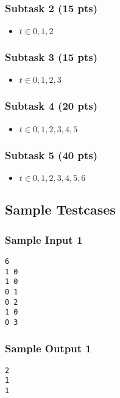 \subsubsection{Subtask 2 (15 pts)}\label{subtask-2}
\begin{itemize}
\item $t\in 0, 1, 2$
\end{itemize}

\subsubsection{Subtask 3 (15 pts)}\label{subtask-3}
\begin{itemize}
\item $t\in 0, 1, 2, 3$
\end{itemize}

\subsubsection{Subtask 4 (20 pts)}\label{subtask-4}
\begin{itemize}
\item $t\in 0, 1, 2, 3, 4, 5$
\end{itemize}

\subsubsection{Subtask 5 (40 pts)}\label{subtask-5}
\begin{itemize}
\item $t\in 0, 1, 2, 3, 4, 5, 6$
\end{itemize}

\subsection{Sample Testcases}\label{sample-testcases}

\begin{multicols}{2}
\subsubsection{Sample Input 1}\label{sample-input-1}
\begin{verbatim}
6
1 0
1 0
0 1
0 2
1 0
0 3
\end{verbatim}

\columnbreak

\subsubsection{Sample Output 1}\label{sample-output-1}
\begin{verbatim}
2
1
1
\end{verbatim}
\end{multicols}

